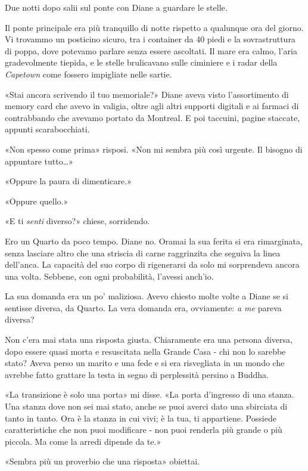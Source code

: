\separatorefiori

Due notti dopo salii sul ponte con Diane a guardare le stelle.

Il ponte principale era più tranquillo di notte rispetto a qualunque ora
del giorno. Vi trovammo un posticino sicuro, tra i container da 40 piedi
e la sovrastruttura di poppa, dove potevamo parlare senza essere
ascoltati. Il mare era calmo, l'aria gradevolmente tiepida, e le stelle
brulicavano sulle ciminiere e i radar della \emph{Capetown} come fossero
impigliate nelle sartie.

«Stai ancora scrivendo il tuo memoriale?» Diane aveva visto
l'assortimento di memory card che avevo in valigia, oltre agli altri
supporti digitali e ai farmaci di contrabbando che avevamo portato da
Montreal. E poi taccuini, pagine staccate, appunti scarabocchiati.

«Non spesso come prima» risposi. «Non mi sembra più così urgente. Il
bisogno di appuntare tutto\ldots»

«Oppure la paura di dimenticare.»

«Oppure quello.»

«E ti \emph{senti} diverso?» chiese, sorridendo.

Ero un Quarto da poco tempo. Diane no. Oramai la sua ferita si era
rimarginata, senza lasciare altro che una striscia di carne raggrinzita
che seguiva la linea dell'anca. La capacità del suo corpo di rigenerarsi
da solo mi sorprendeva ancora una volta. Sebbene, con ogni probabilità,
l'avessi anch'io.

La sua domanda era un po' maliziosa. Avevo chiesto molte volte a Diane
se si sentisse diversa, da Quarto. La vera domanda era, ovviamente:
\emph{a me} pareva diversa?

Non c'era mai stata una risposta giusta. Chiaramente era una persona
diversa, dopo essere quasi morta e resuscitata nella Grande Casa - chi
non lo sarebbe stato? Aveva perso un marito e una fede e si era
risvegliata in un mondo che avrebbe fatto grattare la testa in segno di
perplessità persino a Buddha.

«La transizione è solo una porta» mi disse. «La porta d'ingresso di una
stanza. Una stanza dove non sei mai stato, anche se puoi averci dato una
sbirciata di tanto in tanto. Ora è la stanza in cui vivi; è la tua, ti
appartiene. Possiede caratteristiche che non puoi modificare - non puoi
renderla più grande o più piccola. Ma come la arredi dipende da te.»

«Sembra più un proverbio che una risposta» obiettai.

